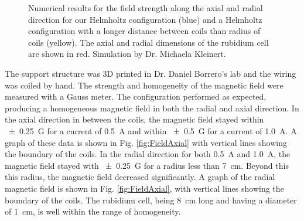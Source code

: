 \begin{figure}[htpb]
\begin{minipage}{.49\textwidth}
	\end{minipage}
	\caption{Numerical results for the field strength along the axial and radial direction for our Helmholtz configuration (blue) and a Helmholtz configuration with a longer distance between coils than radius of coils (yellow). The axial and radial dimensions of the rubidium cell are shown in red. Simulation by Dr. Michaela Kleinert.}
	\label{fig:axialtheoretical}
\end{figure}


The support structure was 3D printed in Dr. Daniel Borrero's lab and the wiring was coiled by hand. The strength and homogeneity of the magnetic field were measured with a Gauss meter. The configuration performed as expected, producing a homogeneous magnetic field in both the radial and axial direction. In the axial direction in between the coils, the magnetic field stayed within \SI{\pm 0.25}{ G} for a current of \SI{0.5}{ A} and within \SI{\pm 0.5}{ G} for a current of \SI{1.0}{ A}. A graph of these data is shown in Fig. \ref{fig:FieldAxial} with vertical lines showing the boundary of the coils. In the radial direction for both \SI{0.5}{ A} and \SI{1.0}{ A}, the magnetic field stayed with \SI{\pm 0.25}{ G} for a radius less than \SI{7}{\centi \meter}. Beyond this this radius, the magnetic field decreased significantly. A graph of the radial magnetic field is shown in Fig. \ref{fig:FieldAxial}, with vertical lines showing the boundary of the coils. The rubidium cell, being \SI{8}{\centi \meter} long and having a diameter of \SI{1}{\centi \meter}, is well within the range of homogeneity.


